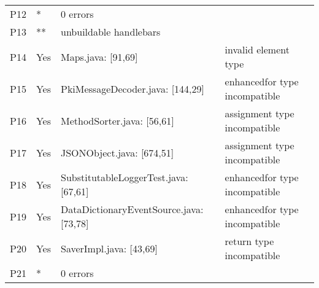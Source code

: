 \begin{table}[]
\begin{tabular}{|p{1.5cm}|p{1cm}|p{4cm}|p{5cm}|}
        P12 & *  & 0 errors &  \\
        P13 & ** & unbuildable handlebars &  \\
        P14 & Yes  & Maps.java: [91,69] & invalid element type   \\
        P15 & Yes & PkiMessageDecoder.java: [144,29]  &  enhancedfor type incompatible  \\
        P16 & Yes & MethodSorter.java: [56,61]  & assignment type incompatible  \\
        P17 & Yes & JSONObject.java: [674,51]  & assignment type incompatible  \\
        P18 & Yes & SubstitutableLoggerTest.java: [67,61]   & enhancedfor type incompatible  \\
        P19 & Yes & DataDictionaryEventSource.java: [73,78]  &  enhancedfor type incompatible  \\
        P20 & Yes & SaverImpl.java: [43,69]  &  return type incompatible  \\
        P21 & * & 0 errors &   \\ \hline
    \end{tabular}
\end{table}
